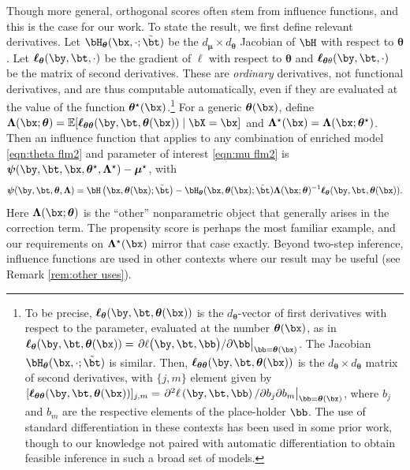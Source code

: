 \documentclass[12pt]{article}
\numberwithin{equation}{section}
\theoremstyle{definition}
\newcommand{\E}{\mathbb{E}}
\newcommand{\bmu}{\boldsymbol{\mu}}
\newcommand{\btheta}{\boldsymbol{\theta}}
\newcommand{\bpsi}{\boldsymbol{\psi}}
\newcommand{\bL}{\boldsymbol{\Lambda}}
\newcommand{\bmtrue}{\bmu^\star}
\newcommand{\bttrue}{\btheta^\star}
\newcommand{\bLtrue}{\bL^\star}
\newcommand{\btstar}{\tilde{\bt}}
\newcommand{\dmu}{d_{\bmu}}  %
\newcommand{\dtheta}{d_{\btheta}}  %
\begin{document}
Though more general, orthogonal scores often stem from influence functions, and this is the case for our work. To state the result, we first define relevant derivatives. Let $\bH_{\btheta}(\bx, \cdot; \btstar)$ be the $\dmu \times \dtheta$ Jacobian of $\bH$ with respect to $\btheta$. Let $\bm{\ell}_{\btheta}(\by, \bt, \cdot)$ be the gradient of $\ell$ with respect to $\btheta$ and $\bm{\ell}_{\btheta\theta}(\by, \bt, \cdot)$ be the matrix of second derivatives. These are \emph{ordinary} derivatives, not functional derivatives, and are thus computable automatically, even if they are evaluated at the value of the function $\bttrue(\bx)$.\footnote{To be precise, $\bm{\ell}_{\btheta}(\by, \bt, \btheta(\bx))$ is the $\dtheta$-vector of first derivatives with respect to the parameter, evaluated at the number $\btheta(\bx)$, as in $\bm{\ell}_{\btheta}(\by,\bt, \btheta(\bx)) = \left. \partial \ell\big(\by,\bt, \bb \big) / \partial \bb \right|_{\bb = \btheta(\bx)}$.
The Jacobian $\bH_{\btheta}(\bx, \cdot; \btstar)$ is similar. Then, $\bm{\ell}_{\btheta\btheta}(\by,\bt, \btheta(\bx))$ is the $\dtheta \times \dtheta$ matrix of second derivatives, with $\{j, m\}$ element given by $[\bm{\ell}_{\btheta\btheta}(\by,\bt, \btheta(\bx))]_{j,m} = \left.  \partial^2 \ell\left(\by,\bt, \bb \right) / \partial b_{j}\partial b_{m} \right \vert_{\bb = \btheta(\bx)}$, where $b_{j}$ and $b_{m}$ are the respective elements of the place-holder $\bb$. The use of standard differentiation in these contexts has been used in some prior work, though to our knowledge not paired with automatic differentiation to obtain feasible inference in such a broad set of models.
} 
For a generic $\btheta(\bx)$, define $\bL(\bx; \btheta) = \E [  \bm{\ell}_{\btheta\btheta}(\by,\bt, \btheta(\bx)) \mid \bX = \bx ]$ and $\bLtrue(\bx) = \bL(\bx; \bttrue)$. Then an influence function that applies to any combination of enriched model \eqref{eqn:theta flm2} and parameter of interest \eqref{eqn:mu flm2} is $\bpsi(\by,\bt,\bx, \bttrue, \bLtrue) - \bmtrue$, with
\begin{equation}
    \label{eqn:if flm2}
    \bpsi(\by, \bt, \btheta, \bL) =  \bH\left(\bx, \btheta(\bx); \btstar\right)   - \bH_{\btheta}(\bx, \btheta(\bx ); \btstar) \bL(\bx; \btheta)^{-1} \bm{\ell}_{\btheta}(\by,\bt, \btheta(\bx)).
\end{equation}
Here $\bL(\bx; \btheta)$ is the ``other'' nonparametric object that generally arises in the correction term. The propensity score is perhaps the most familiar example, and our requirements on $\bLtrue(\bx)$ mirror that case exactly. Beyond two-step inference, influence functions are used in other contexts where our result may be useful (see Remark \ref{rem:other uses}).
\end{document}
